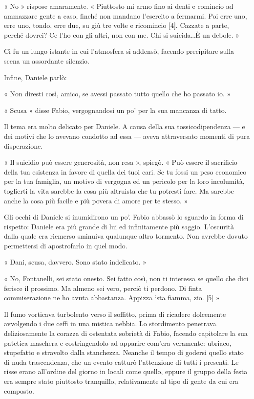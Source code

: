 « No » rispose amaramente. « Piuttosto mi armo fino ai denti e comincio ad ammazzare gente a caso, finché non mandano l'esercito a fermarmi. Poi erre uno, erre uno, tondo, erre due, su giù tre volte e ricomincio [4]. Cazzate a parte, perché dovrei? Ce l'ho con gli altri, non con me. Chi si suicida\ldots È un debole. »

Ci fu un lungo istante in cui l'atmosfera si addensò, facendo precipitare sulla scena un assordante silenzio.

Infine, Daniele parlò:

« Non diresti così, amico, se avessi passato tutto quello che ho passato io. »

« Scusa » disse Fabio, vergognandosi un po' per la sua mancanza di tatto.

Il tema era molto delicato per Daniele. A causa della sua tossicodipendenza --- e dei motivi che lo avevano condotto ad essa --- aveva attraversato momenti di pura disperazione.

« Il suicidio può essere generosità, non resa », spiegò. « Può essere il sacrificio della tua esistenza in favore di quella dei tuoi cari. Se tu fossi un peso economico per la tua famiglia, un motivo di vergogna ed un pericolo per la loro incolumità, toglierti la vita sarebbe la cosa più altruista che tu potresti fare. Ma sarebbe anche la cosa più facile e più povera di amore per te stesso. »

Gli occhi di Daniele si inumidirono un po'. Fabio abbassò lo sguardo in forma di rispetto: Daniele era più grande di lui ed infinitamente più saggio. L'oscurità dalla quale era riemerso sminuiva qualunque altro tormento. Non avrebbe dovuto permettersi di apostrofarlo in quel modo.

« Dani, scusa, davvero. Sono stato indelicato. »

« No, Fontanelli, sei stato onesto. Sei fatto così, non ti interessa se quello che dici ferisce il prossimo. Ma almeno sei vero, perciò ti perdono. Di finta commiserazione ne ho avuta abbastanza. Appizza `sta fiamma, zio. [5] »

Il fumo vorticava turbolento verso il soffitto, prima di ricadere dolcemente avvolgendo i due ceffi in una mistica nebbia. Lo stordimento penetrava deliziosamente la corazza di ostentata sobrietà di Fabio, facendo capitolare la sua patetica maschera e costringendolo ad apparire com'era veramente: ubriaco, stupefatto e stravolto dalla stanchezza. Neanche il tempo di godersi quello stato di nuda trascendenza, che un evento catturò l'attenzione di tutti i presenti. Le risse erano all'ordine del giorno in locali come quello, eppure il gruppo della festa era sempre stato piuttosto tranquillo, relativamente al tipo di gente da cui era composto.

